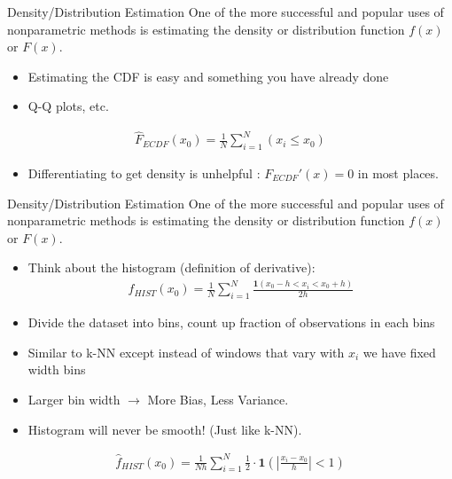 \begin{frame}{Density/Distribution Estimation}
One of the more successful and popular uses of nonparametric methods is estimating the density or distribution function $f(x)$ or $F(x)$.
\begin{itemize}
\item Estimating the CDF is easy and something you have already done
\item Q-Q plots, etc.
\end{itemize}
\begin{eqnarray*}
\hat{F}_{ECDF}(x_0) = \frac{1}{N} \sum_{i=1}^N (x_i \leq x_0 )
\end{eqnarray*}
\begin{itemize}
\item Differentiating to get density is unhelpful : $F_{ECDF}'(x) = 0$ in most places.
\end{itemize}
\end{frame}


\begin{frame}{Density/Distribution Estimation}
One of the more successful and popular uses of nonparametric methods is estimating the density or distribution function $f(x)$ or $F(x)$.
\begin{itemize}
\item Think about the histogram (definition of derivative):
\begin{eqnarray*}
\hat{f}_{HIST}(x_0) = \frac{1}{N} \sum_{i=1}^N \frac{\mathbf{1}(x_0 - h < x_i < x_0 + h)}{2 h}
\end{eqnarray*}
\item Divide the dataset into bins, count up fraction of observations in each bins
\item Similar to k-NN except instead of windows that vary with $x_i$ we have fixed width bins
\item Larger bin width $\rightarrow$ More Bias, Less Variance.
\item Histogram will never be smooth! (Just like k-NN).
\end{itemize}
\begin{eqnarray*}
\hat{f}_{HIST}(x_0) = \frac{1}{Nh} \sum_{i=1}^N  \frac{1}{2} \cdot \mathbf{1} \left (|\frac{x_i - x_0}{h}| < 1 \right)
\end{eqnarray*}
\end{frame}


